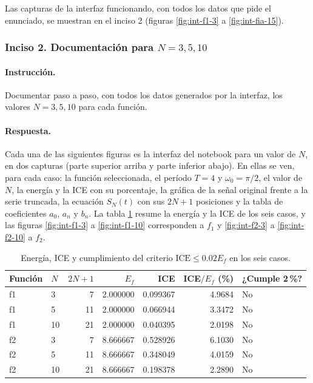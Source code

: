 \documentclass[11pt]{article}
\begin{document}
Las capturas de la interfaz funcionando, con todos los datos que pide el enunciado, se muestran en el inciso 2
(figuras \ref{fig:int-f1-3} a \ref{fig:int-fia-15}).

\subsubsection*{Inciso 2. Documentación para $N=3,5,10$}

\paragraph{Instrucción.}
Documentar paso a paso, con todos los datos generados por la interfaz, los valores $N=3,5,10$ para cada función.

\paragraph{Respuesta.}
Cada una de las siguientes figuras es la interfaz del notebook para un valor de $N$, en dos capturas (parte superior arriba y
parte inferior abajo). En ellas se ven, para cada caso: la función seleccionada, el período $T=4$ y $\omega_0=\pi/2$, el valor
de $N$, la energía y la ICE con su porcentaje, la gráfica de la señal original frente a la serie truncada, la ecuación
$S_N(t)$ con sus $2N+1$ posiciones y la tabla de coeficientes $a_0$, $a_n$ y $b_n$. La tabla \ref{tab:resumen6} resume la
energía y la ICE de los seis casos, y las figuras \ref{fig:int-f1-3} a \ref{fig:int-f1-10} corresponden a $f_1$ y
\ref{fig:int-f2-3} a \ref{fig:int-f2-10} a $f_2$.

\begin{table}[!htbp]
\centering
\caption{Energía, ICE y cumplimiento del criterio $\mathrm{ICE}\le0.02E_f$ en los seis casos.}
\label{tab:resumen6}
\begin{tabular}{llrrrrl}
\hline
\rowcolor{pastelblue}
Función & $N$ & $2N+1$ & $E_f$ & ICE & ICE$/E_f$ (\%) & ¿Cumple 2\,\%?\\
\hline
f1 & 3 & 7 & 2.000000 & 0.099367 & 4.9684 & No\\
f1 & 5 & 11 & 2.000000 & 0.066944 & 3.3472 & No\\
f1 & 10 & 21 & 2.000000 & 0.040395 & 2.0198 & No\\
\hline
f2 & 3 & 7 & 8.666667 & 0.528926 & 6.1030 & No\\
f2 & 5 & 11 & 8.666667 & 0.348049 & 4.0159 & No\\
f2 & 10 & 21 & 8.666667 & 0.198378 & 2.2890 & No\\
\hline
\end{tabular}
\end{table}
\end{document}
